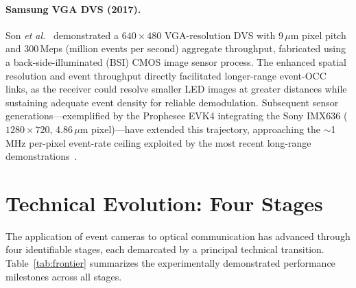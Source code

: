 \documentclass[10pt,a4paper]{article}
\begin{document}
\paragraph{Samsung VGA DVS (2017).}
Son \emph{et al.}~\cite{son2017samsungdvs} demonstrated a $640\times480$
VGA-resolution DVS with 9\,$\mu$m pixel pitch and 300\,Meps (million
events per second) aggregate throughput, fabricated using a
back-side-illuminated (BSI) CMOS image sensor process. The enhanced
spatial resolution and event throughput directly facilitated
longer-range event-OCC links, as the receiver could resolve smaller LED
images at greater distances while sustaining adequate event density for
reliable demodulation. Subsequent sensor generations---exemplified by
the Prophesee EVK4 integrating the Sony IMX636 ($1280\times720$,
4.86\,$\mu$m pixel)---have extended this trajectory, approaching the
$\sim$1\,MHz per-pixel event-rate ceiling exploited by the most recent
long-range demonstrations~\cite{nardo2026longrange}.

\section{Technical Evolution: Four Stages}
\label{sec:evolution}

The application of event cameras to optical communication has advanced
through four identifiable stages, each demarcated by a principal
technical transition. Table~\ref{tab:frontier} summarizes the
experimentally demonstrated performance milestones across all stages.
\end{document}
